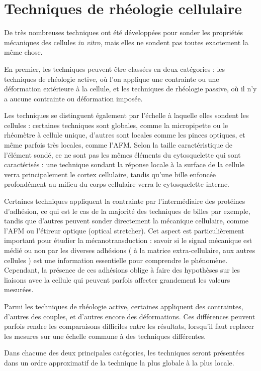 \documentclass{report}
\begin{document}
\section{Techniques de rhéologie cellulaire}

De très nombreuses techniques ont été développées pour sonder les propriétés mécaniques des cellules \textit{in vitro}, mais elles ne sondent pas toutes exactement la même chose. 

En premier, les techniques peuvent être classées en deux catégories : les techniques de rhéologie active, où l'on applique une contrainte ou une déformation extérieure à la cellule, et les techniques de rhéologie passive, où il n'y a aucune contrainte ou déformation imposée. 

Les techniques se distinguent également par l'échelle à laquelle elles sondent les cellules : certaines techniques sont globales, comme la micropipette ou le rhéomètre à cellule unique, d'autres sont locales comme les pinces optiques, et même parfois très locales, comme l'AFM. 
Selon la taille caractéristique de l'élément sondé, ce ne sont pas les mêmes éléments du cytosquelette qui sont caractérisés : une technique sondant la réponse locale à la surface de la cellule verra principalement le cortex cellulaire, tandis qu'une bille enfoncée profondément au milieu du corps cellulaire verra le cytosquelette interne. 

Certaines techniques appliquent la contrainte par l'intermédiaire des protéines d'adhésion, ce qui est le cas de la majorité des techniques de billes par exemple, tandis que d'autres peuvent sonder directement la mécanique cellulaire, comme l'AFM ou l'étireur optique (optical stretcher). Cet aspect est particulièrement important pour étudier la mécanotransduction : savoir si le signal mécanique est médié ou non par les diverses adhésions ( à la matrice extra-cellulaire, aux autres cellules ) est une information essentielle pour comprendre le phénomène. 
Cependant, la présence de ces adhésions oblige à faire des hypothèses sur les liaisons avec la cellule qui peuvent parfois affecter grandement les valeurs mesurées. 

Parmi les techniques de rhéologie active, certaines appliquent des contraintes, d'autres des couples, et d'autres encore des déformations. Ces différences peuvent parfois rendre les comparaisons difficiles entre les résultats, lorsqu'il faut replacer les mesures sur une échelle commune à des techniques différentes. 

Dans chacune des deux principales catégories, les techniques seront présentées dans un ordre approximatif de la technique la plus globale à la plus locale. 
\end{document}

